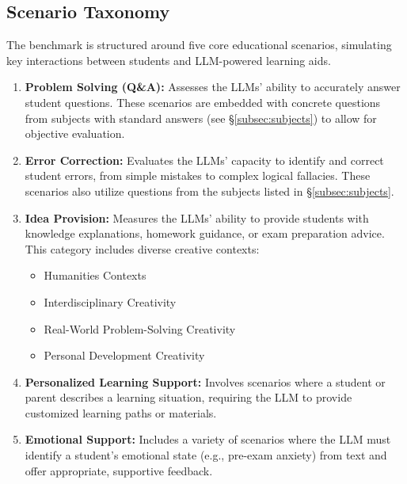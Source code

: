 \documentclass[letterpaper]{article} %
\begin{document}
\subsection{Scenario Taxonomy}
The benchmark is structured around five core educational scenarios, simulating key interactions between students and LLM-powered learning aids.
\begin{enumerate}
    \item \textbf{Problem Solving (Q\&A):} Assesses the LLMs' ability to accurately answer student questions. These scenarios are embedded with concrete questions from subjects with standard answers (see \S\ref{subsec:subjects}) to allow for objective evaluation.
    
    \item \textbf{Error Correction:} Evaluates the LLMs' capacity to identify and correct student errors, from simple mistakes to complex logical fallacies. These scenarios also utilize questions from the subjects listed in \S\ref{subsec:subjects}.
    
    \item \textbf{Idea Provision:} Measures the LLMs' ability to provide students with knowledge explanations, homework guidance, or exam preparation advice. This category includes diverse creative contexts:
    \begin{itemize}
        \item Humanities Contexts
        \item Interdisciplinary Creativity
        \item Real-World Problem-Solving Creativity
        \item Personal Development Creativity
    \end{itemize}
    
    \item \textbf{Personalized Learning Support:} Involves scenarios where a student or parent describes a learning situation, requiring the LLM to provide customized learning paths or materials.
    
    \item \textbf{Emotional Support:} Includes a variety of scenarios where the LLM must identify a student's emotional state (e.g., pre-exam anxiety) from text and offer appropriate, supportive feedback.
\end{enumerate}
\end{document}
